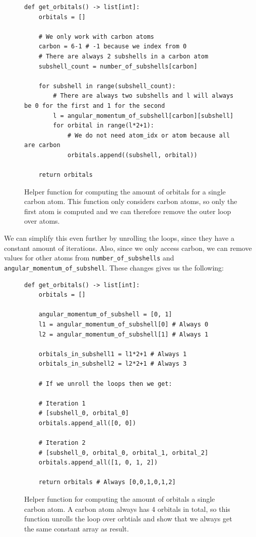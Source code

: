 \begin{figure}[H]
\begin{verbatim}
def get_orbitals() -> list[int]:
    orbitals = []

    # We only work with carbon atoms
    carbon = 6-1 # -1 because we index from 0
    # There are always 2 subshells in a carbon atom
    subshell_count = number_of_subshells[carbon]

    for subshell in range(subshell_count):
        # There are always two subshells and l will always be 0 for the first and 1 for the second
        l = angular_momentum_of_subshell[carbon][subshell]
        for orbital in range(l*2+1):
            # We do not need atom_idx or atom because all are carbon
            orbitals.append((subshell, orbital))

    return orbitals
\end{verbatim}
\caption{Helper function for computing the amount of orbitals for a single carbon atom. This function only considers carbon atoms, so only the first atom is computed and we can therefore remove the outer loop over atoms.}
\end{figure}

We can simplify this even further by unrolling the loops, since they have a constant amount of iterations. Also, since we only access carbon, we can remove values for other atoms from \verb|number_of_subshells| and \verb|angular_momentum_of_subshell|. These changes gives us the following:

\begin{figure}[H]
\begin{verbatim}
def get_orbitals() -> list[int]:
    orbitals = []

    angular_momentum_of_subshell = [0, 1]
    l1 = angular_momentum_of_subshell[0] # Always 0
    l2 = angular_momentum_of_subshell[1] # Always 1

    orbitals_in_subshell1 = l1*2+1 # Always 1
    orbitals_in_subshell2 = l2*2+1 # Always 3

    # If we unroll the loops then we get:

    # Iteration 1
    # [subshell_0, orbital_0]
    orbitals.append_all([0, 0])

    # Iteration 2
    # [subshell_0, orbital_0, orbital_1, orbital_2]
    orbitals.append_all([1, 0, 1, 2])

    return orbitals # Always [0,0,1,0,1,2]
\end{verbatim}
\caption{Helper function for computing the amount of orbitals a single carbon atom. A carbon atom always has 4 orbitals in total, so this function unrolls the loop over orbtials and show that we always get the same constant array as result.}
\end{figure}

